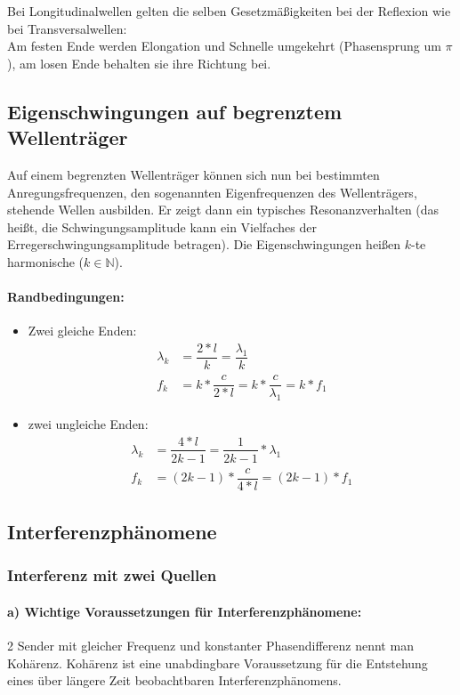 \documentclass[12 pt]{article}
\numberwithin{equation}{section}
\begin{document}
	Bei Longitudinalwellen gelten die selben Gesetzmäßigkeiten bei der Reflexion wie bei Transversalwellen:\\
	Am festen Ende werden Elongation und Schnelle umgekehrt (Phasensprung um $\pi$), am losen Ende behalten sie ihre Richtung bei.
	\subsection{Eigenschwingungen auf begrenztem Wellenträger}
	Auf einem begrenzten Wellenträger können sich nun bei bestimmten Anregungsfrequenzen, den sogenannten Eigenfrequenzen des Wellenträgers, stehende Wellen ausbilden.
	Er zeigt dann ein typisches Resonanzverhalten (das heißt, die Schwingungsamplitude kann ein Vielfaches der Erregerschwingungsamplitude betragen). Die Eigenschwingungen heißen $k$-te harmonische ($k\in\mathbb{N}$).\\
	\paragraph{Randbedingungen:} 
	\begin{itemize}
		\item Zwei gleiche Enden:
		\begin{align*}
			\lambda_k&=\dfrac{2*l}{k}	=\dfrac{\lambda_1}{k}\\
			f_k&=k*\dfrac{c}{2*l}=k*\dfrac{c}{\lambda_1}=k*f_1
		\end{align*}
		\item zwei ungleiche Enden:
		\begin{align*}
			\lambda_k&=\dfrac{4*l}{2k-1}=\dfrac{1}{2k-1}*\lambda_1\\
			f_k&=(2k-1)*\dfrac{c}{4*l}=(2k-1)*f_1
		\end{align*}
	\end{itemize}
	\subsection{Interferenzphänomene}
	\subsubsection{Interferenz mit zwei Quellen}
	\paragraph{a) Wichtige Voraussetzungen für Interferenzphänomene:}
	2 Sender mit gleicher Frequenz und konstanter Phasendifferenz nennt man Kohärenz.
	Kohärenz ist eine unabdingbare Voraussetzung für die Entstehung eines über längere Zeit beobachtbaren Interferenzphänomens.
\end{document}
